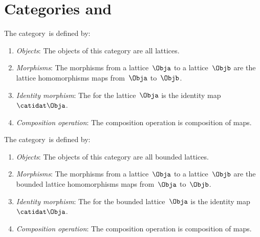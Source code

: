 \section{Categories \Lat and \BoundedLat}
\begin{ctdefinition}
    \label{def:Lat}
    The category~\Lat is defined by:
    \begin{enumerate}
        \item \emph{Objects}: The objects of this category are all lattices.
        \item \emph{Morphisms}: The morphisms from a lattice~$\Obja$ to a lattice~$\Objb$ are the lattice homomorphisms maps from~$\Obja$ to~$\Objb$.
        \item \emph{Identity morphism}: The  for the lattice~$\Obja$
              is the identity map~$\catidat\Obja$.
        \item \emph{Composition operation}: The composition operation is composition of maps.
    \end{enumerate}
\end{ctdefinition}

\begin{ctdefinition}
    \label{def:BoundedLat}
    The category~\BoundedLat is defined by:
    \begin{enumerate}
        \item \emph{Objects}: The objects of this category are all bounded lattices.
        \item \emph{Morphisms}: The morphisms from a lattice~$\Obja$ to a lattice~$\Objb$ are the bounded lattice homomorphisms maps from~$\Obja$ to~$\Objb$.
        \item \emph{Identity morphism}: The  for the bounded lattice~$\Obja$
              is the identity map~$\catidat\Obja$.
        \item \emph{Composition operation}: The composition operation is composition of maps.
    \end{enumerate}
\end{ctdefinition}

